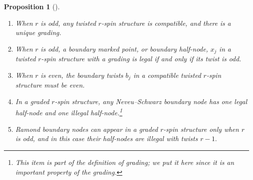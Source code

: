 \documentclass[11pt]{amsart}
\newtheorem{prop}[dummy]{Proposition}
\theoremstyle{definition}
\theoremstyle{remark}
\newcommand{\<}{\left<}
\renewcommand{\>}{\right>}
\numberwithin{equation}{section}
\begin{document}
\begin{prop}[{\cite[Proposition 2.3]{BCT2}}] 
\label{prop lifting}
\begin{enumerate}
\item\label{it lift odd exist} When %
$r$ is odd, any twisted $r$-spin structure is compatible, and there is a unique %
grading.
\item\label{it lift odd legal} When %
$r$ is odd, a boundary marked point, or boundary half-node, $x_j$ in a twisted $r$-spin structure with a grading is legal if and only if its twist is %
odd.
\item\label{it lift even compatible} When %
$r$ is even, the boundary twists $b_j$ in a compatible twisted $r$-spin structure must be %
even.  

\item\label{it NS nodes}
In %
a graded $r$-spin structure, any Neveu--Schwarz boundary node has one legal half-node and one %
illegal half-node.\footnote{This item is part of the definition of grading; we put it here since it is an important property of the grading.}

\item\label{it Ramond boundary node}
Ramond %
boundary nodes can appear in a graded $r$-spin structure only when $r$ is odd, and in %
this case their %
half-nodes are illegal with twists %
$r-1.$


\end{enumerate}
\end{prop}
\end{document}
